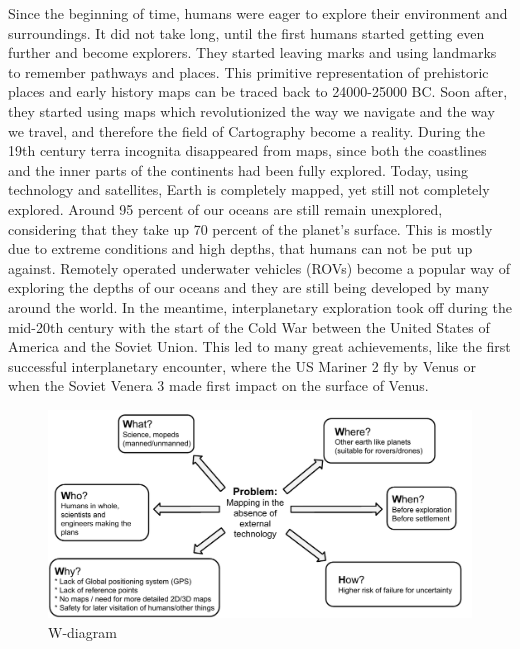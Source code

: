 Since the beginning of time, humans were eager to explore their environment and surroundings. It did not take long, until the first humans started getting even further and become explorers. They started leaving marks and using landmarks to remember pathways and places. This primitive representation of prehistoric places and early history maps can be traced back to 24000-25000 BC. Soon after, they started using maps which revolutionized the way we navigate and the way we travel, and therefore the field of Cartography become a reality. During the 19th century terra incognita disappeared from maps, since both the coastlines and the inner parts of the continents had been fully explored. Today, using technology and satellites, Earth is completely mapped, yet still not completely explored. Around 95 percent of our oceans are still remain unexplored, considering that they take up 70 percent of the planet's surface. This is mostly due to extreme conditions and high depths, that humans can not be put up against. Remotely operated underwater vehicles (ROVs) become a popular way of exploring the depths of our oceans and they are still being developed by many around the world. In the meantime, interplanetary exploration took off during the mid-20th century with the start of the Cold War between the United States of America and the Soviet Union. This led to many great achievements, like the first successful interplanetary encounter, where the US Mariner 2 fly by Venus or when the Soviet Venera 3 made first impact on the surface of Venus.


\begin{figure}[!htb]
	\centering
	\includegraphics[scale=.7]{images/wdiagram1.pdf}
	\caption{W-diagram}
	\label{fig:wdiagram}
\end{figure}

